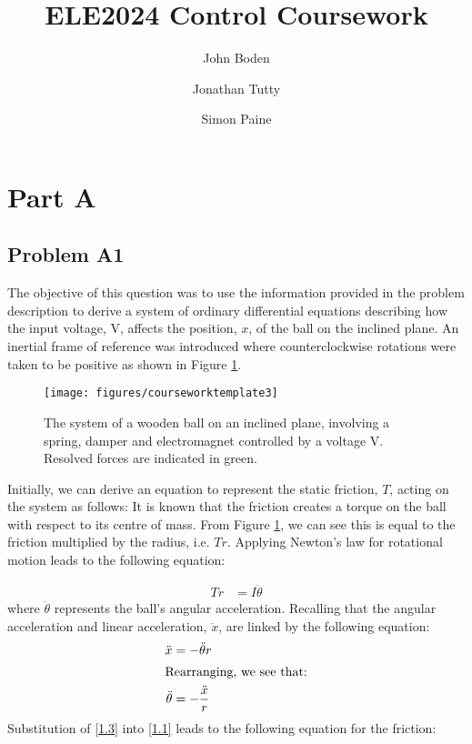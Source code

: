 \documentclass[a4paper,10pt,reqno]{amsart}
\title[ELE2024 Coursework]{ELE2024 Control Coursework}
\author[J. Boden]{John Boden}
\author[J. Tutty]{Jonathan Tutty}
\author[S. Paine]{Simon Paine}
\numberwithin{equation}{section}
\begin{document}
\maketitle

\section{Part A}

\subsection{Problem A1}\label{sec:a1}
The objective of this question was to use the information provided in the problem description to derive a system of ordinary differential equations describing how the input voltage, V, affects the position, $x$, of the ball on the inclined plane.
\newline An inertial frame of reference was introduced where counterclockwise rotations were taken to be positive as shown in Figure \ref{fig:system}.

\begin{figure}[h]
\centering
\texttt{[image: figures/courseworktemplate3]}
\caption{The system of a wooden ball on an inclined plane, involving a spring, damper and electromagnet controlled by a voltage V. Resolved forces are indicated in green.}
\label{fig:system}
\end{figure}
Initially, we can derive an equation to represent the static friction, $T$, acting on the system as follows:
It is known that the friction creates a torque on the ball with respect to its centre of mass. From Figure \ref{fig:system}, we can see this is equal to the friction multiplied by the radius, i.e. $Tr$. 
Applying Newton's law for rotational motion leads to the following equation:

\begin{align}
\label{1.1}
Tr &= I\ddot{\theta}
\end{align}
where $\ddot{\theta}$ represents the ball's angular acceleration. Recalling that the angular acceleration and linear acceleration, $\ddot{x}$, are linked by the following equation:
\begin{align}
\ddot{x} &= - \ddot{\theta}r \label{1.2} \\
\intertext{Rearranging, we see that:}
\ddot{\theta} &= - \frac{\ddot{x}}{r} \label{1.3}
\end{align}
Substitution of \eqref{1.3} into \eqref{1.1} leads to the following equation for the friction:
\end{document}

